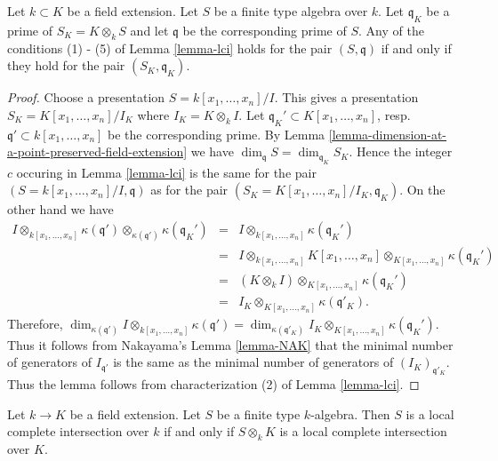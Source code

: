 \begin{lemma}
\label{lemma-lci-field-change-local}
Let $k \subset K$ be a field extension.
Let $S$ be a finite type algebra over $k$.
Let $\mathfrak q_K$ be a prime of $S_K = K \otimes_k S$
and let $\mathfrak q$ be the corresponding prime of $S$.
Any of the conditions (1) - (5) of Lemma \ref{lemma-lci}
holds for the pair $(S, \mathfrak q)$ if and only if
they hold for the pair $(S_K, \mathfrak q_K)$.
\end{lemma}

\begin{proof}
Choose a presentation $S = k[x_1, \ldots, x_n]/I$.
This gives a presentation
$S_K = K[x_1, \ldots, x_n]/I_K$ where $I_K = K\otimes_k I$.
Let $\mathfrak q_K' \subset K[x_1, \ldots, x_n]$,
resp.\ $\mathfrak q' \subset k[x_1, \ldots, x_n]$ be
the corresponding prime. By
Lemma \ref{lemma-dimension-at-a-point-preserved-field-extension} we have
$\dim_{\mathfrak q} S = \dim_{\mathfrak q_K} S_K$.
Hence the integer $c$ occuring in Lemma \ref{lemma-lci}
is the same for the pair $(S = k[x_1, \ldots, x_n]/I, \mathfrak q)$
as for the pair $(S_K = K[x_1, \ldots, x_n]/I_K, \mathfrak q_K)$.
On the other hand we have
\begin{eqnarray*}
I \otimes_{k[x_1, \ldots, x_n]} \kappa(\mathfrak q')
\otimes_{\kappa(\mathfrak q')} \kappa(\mathfrak q_K')
& = &
I \otimes_{k[x_1, \ldots, x_n]} \kappa(\mathfrak q_K') \\
& = &
I \otimes_{k[x_1, \ldots, x_n]} K[x_1, \ldots, x_n]
\otimes_{K[x_1, \ldots, x_n]} \kappa(\mathfrak q_K') \\
& = &
(K \otimes_k I) \otimes_{K[x_1, \ldots, x_n]} \kappa(\mathfrak q_K') \\
& = &
I_K \otimes_{K[x_1, \ldots, x_n]} \kappa(\mathfrak q'_K).
\end{eqnarray*}
Therefore,
$\dim_{\kappa(\mathfrak q')}
I \otimes_{k[x_1, \ldots, x_n]} \kappa(\mathfrak q')
=
\dim_{\kappa(\mathfrak q'_K)}
I_K \otimes_{K[x_1, \ldots, x_n]} \kappa(\mathfrak q_K')$.
Thus it follows from
Nakayama's Lemma \ref{lemma-NAK} that the minimal number
of generators of $I_{\mathfrak q'}$ is the same as the minimal
number of generators of $(I_K)_{\mathfrak q'_K}$.
Thus the lemma follows from characterization (2) of Lemma \ref{lemma-lci}.
\end{proof}

\begin{lemma}
\label{lemma-lci-field-change}
Let $k \to K$ be a field extension.
Let $S$ be a finite type $k$-algebra.
Then $S$ is a local complete intersection over $k$ if and
only if $S\otimes_k K$ is a local complete intersection over $K$.
\end{lemma}

